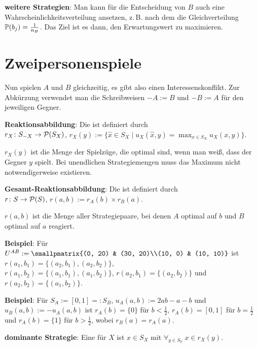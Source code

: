 \textbf{weitere Strategien}:
Man kann für die Entscheidung von $B$ auch eine Wahrscheinlichkeitsverteilung ansetzen,
z.\,B. nach dem  die Gleichverteilung
$\PP(b_j) = \frac{1}{n_B}$.
Das Ziel ist es dann, den Erwartungswert zu maximieren.

\section{%
    Zweipersonenspiele%
}

Nun spielen $A$ und $B$ gleichzeitig, es gibt also einen Interessenskonflikt.
Zur Abkürzung verwendet man die Schreibweisen $-A := B$ und $-B := A$ für den jeweiligen Gegner.

\textbf{Reaktionsabbildung}:
Die  ist definiert durch\\
$r_X\colon S_{-X} \to \P(S_X)$,
$r_X(y) := \{\widehat{x} \in S_X \;|\; u_X(\widehat{x}, y) = \max_{x \in S_X} u_X(x, y)\}$.

$r_X(y)$ ist die Menge der Spielzüge, die optimal sind, wenn man weiß, dass der Gegner $y$ spielt.
Bei unendlichen Strategiemengen muss das Maximum nicht notwendigerweise existieren.

\textbf{Gesamt-Reaktionsabbildung}:
Die  ist definiert durch\\
$r\colon S \to \P(S)$,
$r(a, b) := r_A(b) \times r_B(a)$.

$r(a, b)$ ist die Menge aller Strategiepaare, bei denen $A$ optimal auf $b$ und $B$ optimal auf
$a$ reagiert.

\linie

\textbf{Beispiel}:
Für $U^{AB} := \smallpmatrix{(0, 20) & (30, 20)\\(10, 0) & (10, 10)}$ ist
$r(a_1, b_1) = \{(a_2, b_1), (a_2, b_2)\}$,\\
$r(a_1, b_2) = \{(a_1, b_1), (a_1, b_2)\}$,
$r(a_2, b_1) = \{(a_2, b_2)\}$ und
$r(a_2, b_2) = \{(a_1, b_2)\}$.

\textbf{Beispiel}:
Für $S_A := [0, 1] =: S_B$, $u_A(a, b) := 2ab - a - b$ und $u_B(a, b) := -u_A(a, b)$ ist
$r_A(b) = \{0\}$ für $b < \frac{1}{2}$,
$r_A(b) = [0, 1]$ für $b = \frac{1}{2}$ und
$r_A(b) = \{1\}$ für $b > \frac{1}{2}$,
wobei $r_B(a) = r_A(a)$.

\linie

\textbf{dominante Strategie}:
Eine  für $X$
ist $x \in S_X$ mit $\forall_{y \in S_Y}\; x \in r_X(y)$.

